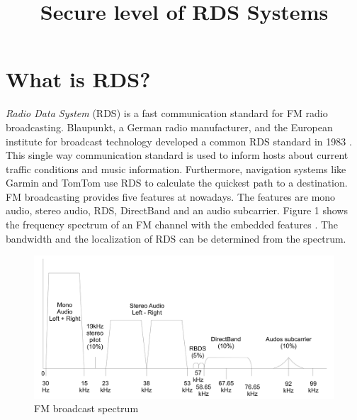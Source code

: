 \documentclass[conference,12pt,a4paper]{IEEEtran}
\begin{document}
	
	\title{Secure level of RDS Systems}
	\author{
	}
	\maketitle
	\thispagestyle{plain}
	\pagestyle{plain}
	
	\section{What is RDS?}
	\textit{Radio Data System} (RDS) is a fast communication standard for FM radio broadcasting. Blaupunkt, a German radio manufacturer, and the European institute for broadcast technology developed a common RDS standard in 1983 \cite{Grds}. This single way communication standard is used to inform hosts about current traffic conditions and music information. Furthermore, navigation systems like Garmin and TomTom use RDS to calculate the quickest path to a destination. FM broadcasting provides five features at nowadays. The features are mono audio, stereo audio, RDS, DirectBand and an audio subcarrier. Figure 1 shows the frequency spectrum of an FM channel with the embedded features \cite{standard}. The bandwidth and the localization of RDS can be determined from the spectrum.
	
	\begin{figure}[h]
		\centering
		\includegraphics[scale=0.13]{img/RDS_spectrum2}
		\caption{FM broadcast spectrum}
		\label{fig: spec}
	\end{figure}
\end{document}
